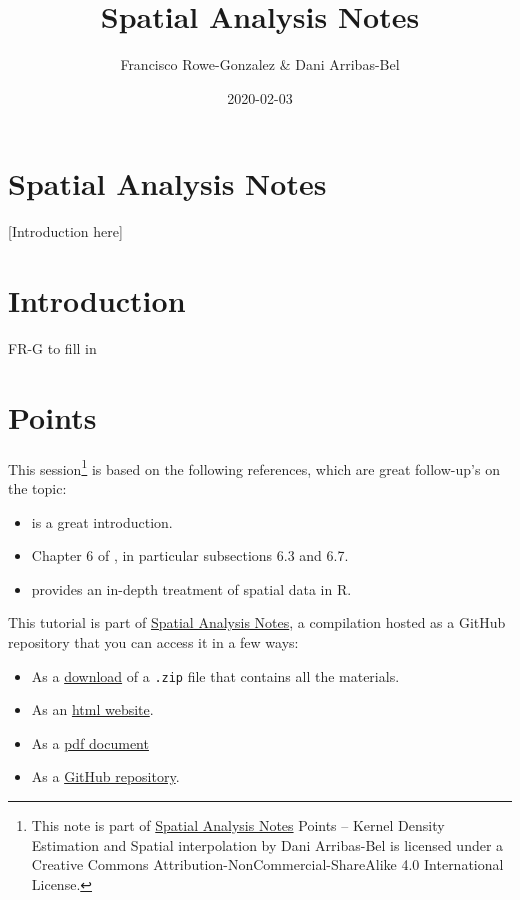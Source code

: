 \documentclass[]{book}
\title{Spatial Analysis Notes}
\author{Francisco Rowe-Gonzalez \& Dani Arribas-Bel}
\date{2020-02-03}
\providecommand{\tightlist}{%
  \setlength{\itemsep}{0pt}\setlength{\parskip}{0pt}}
\let\rmarkdownfootnote\footnote%
\def\footnote{\protect\rmarkdownfootnote}
\begin{document}
\maketitle

{
\setcounter{tocdepth}{1}
\tableofcontents
}
\hypertarget{spatial-analysis-notes}{%
\chapter{Spatial Analysis Notes}\label{spatial-analysis-notes}}

{[}Introduction here{]}

\hypertarget{intro}{%
\chapter{Introduction}\label{intro}}

FR-G to fill in

\hypertarget{points}{%
\chapter{Points}\label{points}}

This session\footnote{This note is part of \href{index.html}{Spatial Analysis Notes} {Points -- Kernel Density Estimation and Spatial interpolation} by Dani Arribas-Bel is licensed under a Creative Commons Attribution-NonCommercial-ShareAlike 4.0 International License.} is based on the following references, which are great follow-up's on the topic:

\begin{itemize}
\tightlist
\item
  \citet{lovelace2014introduction} is a great introduction.
\item
  Chapter 6 of \citet{comber2015}, in particular subsections 6.3 and 6.7.
\item
  \citet{bivand2013applied} provides an in-depth treatment of spatial data in R.
\end{itemize}

This tutorial is part of \href{index.html}{Spatial Analysis Notes}, a compilation hosted as a GitHub repository that you can access it in a few ways:

\begin{itemize}
\tightlist
\item
  As a \href{https://github.com/darribas/spa_notes/archive/master.zip}{download} of a \texttt{.zip} file that contains all the materials.
\item
  As an \href{http://darribas.org/spa_notes/points.html}{html
  website}.
\item
  As a \href{https://github.com/darribas/spa_notes/raw/master/points_book.pdf}{pdf
  document}
\item
  As a \href{https://github.com/darribas/spa_notes}{GitHub repository}.
\end{itemize}
\end{document}
